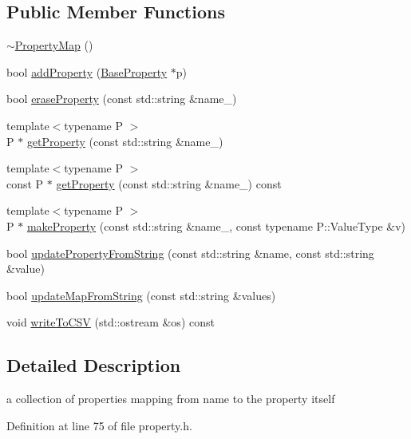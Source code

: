 \subsection*{Public Member Functions}
\begin{DoxyCompactItemize}
\item 
\hyperlink{classg2o_1_1PropertyMap_a0b7213999ad4ea636ffeda176cb92b52}{$\sim$\+Property\+Map} ()
\item 
bool \hyperlink{classg2o_1_1PropertyMap_a6b90b5cfd16125c174e140af6e40dad9}{add\+Property} (\hyperlink{classg2o_1_1BaseProperty}{Base\+Property} $\ast$p)
\item 
bool \hyperlink{classg2o_1_1PropertyMap_a8f96ea923fe711a0ffa6e4c6479945d9}{erase\+Property} (const std\+::string \&name\+\_\+)
\item 
{\footnotesize template$<$typename P $>$ }\\P $\ast$ \hyperlink{classg2o_1_1PropertyMap_ab3a37fb6f8358f3c63a13678349f1f82}{get\+Property} (const std\+::string \&name\+\_\+)
\item 
{\footnotesize template$<$typename P $>$ }\\const P $\ast$ \hyperlink{classg2o_1_1PropertyMap_a4681e164dc742b78b74684bfad09d47c}{get\+Property} (const std\+::string \&name\+\_\+) const 
\item 
{\footnotesize template$<$typename P $>$ }\\P $\ast$ \hyperlink{classg2o_1_1PropertyMap_add6e602dcd651b8883c30c350d23692f}{make\+Property} (const std\+::string \&name\+\_\+, const typename P\+::\+Value\+Type \&v)
\item 
bool \hyperlink{classg2o_1_1PropertyMap_a43df66ba15f9425abbd0e888a7b67251}{update\+Property\+From\+String} (const std\+::string \&name, const std\+::string \&value)
\item 
bool \hyperlink{classg2o_1_1PropertyMap_a0407e6a72afafd608f13cfdffc6ffc06}{update\+Map\+From\+String} (const std\+::string \&values)
\item 
void \hyperlink{classg2o_1_1PropertyMap_a02712d41356082bb724812927b1eef89}{write\+To\+C\+SV} (std\+::ostream \&os) const 
\end{DoxyCompactItemize}


\subsection{Detailed Description}
a collection of properties mapping from name to the property itself 

Definition at line 75 of file property.\+h.



